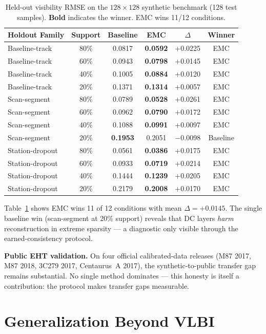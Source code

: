 \documentclass[11pt]{article}
\begin{document}
\begin{table}[t]
\centering
\caption{Held-out visibility RMSE on the $128\times128$ synthetic benchmark (128 test samples). \textbf{Bold} indicates the winner. EMC wins 11/12 conditions.}
\label{tab:benchmark}
\small
\begin{tabular}{@{}lccccc@{}}
\toprule
Holdout Family & Support & Baseline & EMC & $\Delta$ & Winner \\
\midrule
Baseline-track & 80\% & 0.0817 & \textbf{0.0592} & +0.0225 & EMC \\
Baseline-track & 60\% & 0.0943 & \textbf{0.0798} & +0.0145 & EMC \\
Baseline-track & 40\% & 0.1005 & \textbf{0.0884} & +0.0120 & EMC \\
Baseline-track & 20\% & 0.1371 & \textbf{0.1314} & +0.0057 & EMC \\
Scan-segment & 80\% & 0.0789 & \textbf{0.0528} & +0.0261 & EMC \\
Scan-segment & 60\% & 0.0962 & \textbf{0.0790} & +0.0172 & EMC \\
Scan-segment & 40\% & 0.1088 & \textbf{0.0991} & +0.0097 & EMC \\
Scan-segment & 20\% & \textbf{0.1953} & 0.2051 & $-$0.0098 & Baseline \\
Station-dropout & 80\% & 0.0561 & \textbf{0.0386} & +0.0175 & EMC \\
Station-dropout & 60\% & 0.0933 & \textbf{0.0719} & +0.0214 & EMC \\
Station-dropout & 40\% & 0.1444 & \textbf{0.1239} & +0.0205 & EMC \\
Station-dropout & 20\% & 0.2179 & \textbf{0.2008} & +0.0170 & EMC \\
\bottomrule
\end{tabular}
\end{table}

Table~\ref{tab:benchmark} shows EMC wins 11 of 12 conditions with mean $\Delta = +0.0145$. The single baseline win (scan-segment at 20\% support) reveals that DC layers \emph{harm} reconstruction in extreme sparsity --- a diagnostic only visible through the earned-consistency protocol.

\textbf{Public EHT validation.} On four official calibrated-data releases (M87 2017, M87 2018, 3C279 2017, Centaurus~A 2017), the synthetic-to-public transfer gap remains substantial. No single method dominates --- this honesty is itself a contribution: the protocol makes transfer gaps measurable.

\section{Generalization Beyond VLBI}\label{sec:generalization}
\end{document}
